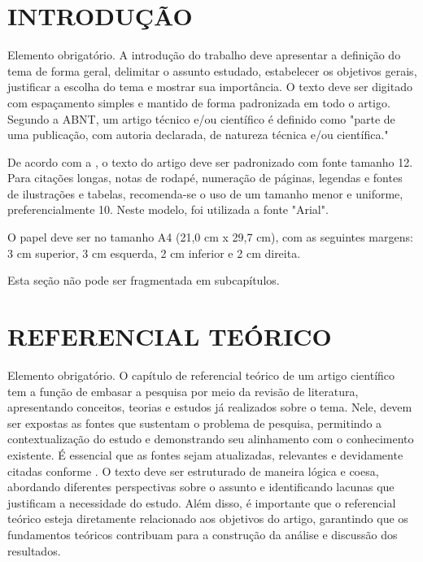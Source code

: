 \documentclass[
	article,             %
	12pt,                %
	oneside,             %
	a4paper,             %
	english,             %
	brazil,              %
	sumario=tradicional
]{abntex2}
\begin{document}

\textual

\section{\textbf{INTRODUÇÃO}}

Elemento obrigatório. A introdução do trabalho deve apresentar a definição do tema de forma geral, delimitar o assunto estudado, estabelecer os objetivos gerais, justificar a escolha do tema e mostrar sua importância. O texto deve ser digitado com espaçamento simples e mantido de forma padronizada em todo o artigo. Segundo a ABNT, um artigo técnico e/ou científico é definido como "parte de uma publicação, com autoria declarada, de natureza técnica e/ou científica." \cite{NBR6022:2018}

De acordo com a , o texto do artigo deve ser padronizado com fonte tamanho 12. Para citações longas, notas de rodapé, numeração de páginas, legendas e fontes de ilustrações e tabelas, recomenda-se o uso de um tamanho menor e uniforme, preferencialmente 10. Neste modelo, foi utilizada a fonte "Arial".

O papel deve ser no tamanho A4 (21,0 cm x 29,7 cm), com as seguintes margens: 3 cm superior, 3 cm esquerda, 2 cm inferior e 2 cm direita.

Esta seção não pode ser fragmentada em subcapítulos.

\section{\textbf{REFERENCIAL TEÓRICO}}

Elemento obrigatório. O capítulo de referencial teórico de um artigo científico tem a função de embasar a pesquisa por meio da revisão de literatura, apresentando conceitos, teorias e estudos já realizados sobre o tema. Nele, devem ser expostas as fontes que sustentam o problema de pesquisa, permitindo a contextualização do estudo e demonstrando seu alinhamento com o conhecimento existente. É essencial que as fontes sejam atualizadas, relevantes e devidamente citadas conforme  . O texto deve ser estruturado de maneira lógica e coesa, abordando diferentes perspectivas sobre o assunto e identificando lacunas que justificam a necessidade do estudo. Além disso, é importante que o referencial teórico esteja diretamente relacionado aos objetivos do artigo, garantindo que os fundamentos teóricos contribuam para a construção da análise e discussão dos resultados.
\end{document}
